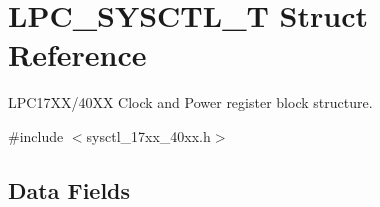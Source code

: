 \hypertarget{structLPC__SYSCTL__T}{\section{L\-P\-C\-\_\-\-S\-Y\-S\-C\-T\-L\-\_\-\-T Struct Reference}
\label{structLPC__SYSCTL__T}
}


L\-P\-C17\-X\-X/40\-X\-X Clock and Power register block structure.  




{\ttfamily \#include $<$sysctl\-\_\-17xx\-\_\-40xx.\-h$>$}

\subsection*{Data Fields}
